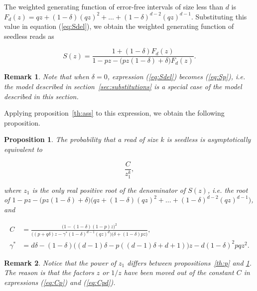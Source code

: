 \documentclass{article}
\newtheorem{proposition}{Proposition}
\newtheorem{remark}{Remark}
\begin{document}
The weighted generating function of error-free intervals of size less than
$d$ is $F_d(z) = qz + (1-\delta)(qz)^2 + \ldots +
(1-\delta)^{d-2}(qz)^{d-1}$.  Substituting this value in equation
(\ref{eq:Sdel}), we obtain the weighted generating function of seedless
reads as

\begin{equation}
\label{eq:Sdel}
S(z) = \frac{1+(1-\delta)F_d(z)}
  {1-pz - \big(pz(1-\delta) + \delta\big)F_d(z)}.
\end{equation}

\begin{remark}
Note that when $\delta = 0$, expression (\ref{eq:Sdel}) becomes
(\ref{eq:Sp}), \textit{i.e.} the model described in
section~\ref{sec:substitutions} is a special case of the model described
in this section.
\end{remark}

Applying proposition~\ref{th:ass} to this expression, we obtain the
following proposition.

\begin{proposition}
\label{th:pd}
The probability that a read of size $k$ is seedless is asymptotically
equivalent to

\begin{equation*}
\frac{C}{z_1^k},
\end{equation*}

\noindent
where $z_1$ is the only real positive root of the denominator of $S(z)$,
\textit{i.e.} the root of $1-pz - \big(pz(1-\delta) +
\delta\big)\big(qz+(1-\delta)(qz)^2 + \ldots +
(1-\delta)^{d-2}(qz)^{d-1}\big)$, and

\begin{equation}
\label{eq:Cpd}
\begin{split}
C &=
\frac{ \big(1-(1-\delta)(1-p)z\big)^2 }
{ \big((p+q\delta)z  -\gamma^*(1-\delta)^{d-1}(qz)^d \big)
\big(\delta+(1-\delta)pz\big) }, \\
\gamma^* &= d\delta -(1-\delta)\big((d-1)\delta-p((d-1)\delta+d+1)\big)z
- d(1-\delta)^2pqz^2.
\end{split}
\end{equation}
\end{proposition}

\begin{remark}
Notice that the power of $z_1$ differs between propositions~\ref{th:p} and
\ref{th:pd}. The reason is that the factors $z$ or $1/z$ have been moved
out of the constant $C$ in expressions (\ref{eq:Cp}) and (\ref{eq:Cpd}).
\end{remark}
\end{document}
